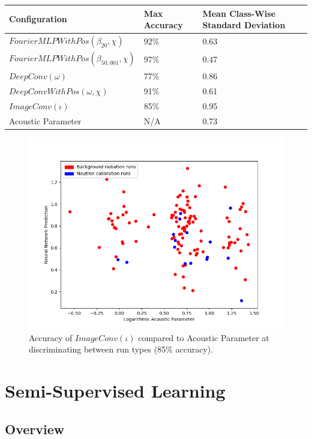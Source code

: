 \documentclass[10pt]{article}
\begin{document}
\begin{tabular}{|l|l|l|}
    \hline
    Configuration & Max Accuracy & Mean Class-Wise Standard Deviation \\
    \hline
    $FourierMLPWithPos(\beta_{20}, \chi)$ & 92\% & 0.63 \\
    \hline
    $FourierMLPWithPos(\beta_{50,001}, \chi)$ & 97\% & 0.47 \\
    \hline
    $DeepConv(\omega)$ & 77\% & 0.86 \\
    \hline
    $DeepConvWithPos(\omega, \chi)$ & 91\% & 0.61 \\
    \hline
    $ImageConv(\iota)$ & 85\% & 0.95 \\
    \hline
    Acoustic Parameter & N/A & 0.73 \\
    \hline
\end{tabular}

\begin{figure}[H]
    \centering
    \includegraphics[width=\textwidth]{image_window}
    \caption{\label{image_window} Accuracy of $ImageConv(\iota)$ compared to Acoustic Parameter at discriminating between run types (85\% accuracy).}
\end{figure}

\section{Semi-Supervised Learning} \label{semi_supervised}

\subsection{Overview}
\end{document}

